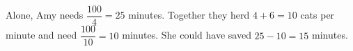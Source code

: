 Alone, Amy needs $\dfrac{100}{4}=25$ minutes. Together they herd $4+6=10$ cats per minute and need $\dfrac{100}{10}=10$ minutes. She could have saved $25-10=\boxed{15}$ minutes.
